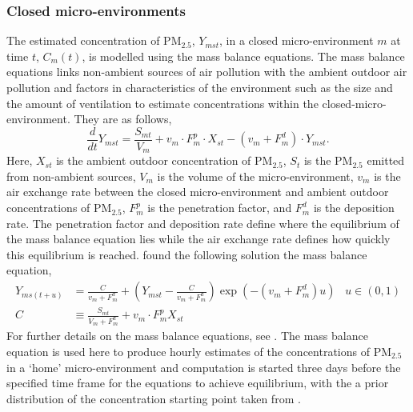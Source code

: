 \documentclass{article}
\begin{document}
\clearpage
\subsubsection{Closed micro-environments}\label{sec::micro}


The estimated concentration of PM$_{2.5}$, $Y_{mst}$, in a closed micro-environment $m$ at time $t$, $C_m(t)$, is modelled using the mass balance equations. The mass balance equations links non-ambient sources of air pollution with the ambient outdoor air pollution and factors in characteristics of the environment such as the size and the amount of ventilation to estimate concentrations within the closed-micro-environment. They are as follows, 
\begin{equation*}
	\frac{d}{dt}Y_{mst} = \frac{S_{mt}}{V_m} + v_m\cdot F^p_m \cdot X_{st} - (v_m + F^d_m)\cdot Y_{mst}. 
\end{equation*}
Here, $X_{st}$ is the ambient outdoor concentration of PM$_{2.5}$, $S_t$ is the PM$_{2.5}$ emitted from non-ambient sources, $V_m$ is the volume of the micro-environment, $v_m$ is the air exchange rate between the closed micro-environment and ambient outdoor concentrations of PM$_{2.5}$, $F^p_m$ is the penetration factor, and $F^d_m$ is the deposition rate. The penetration factor and deposition rate define where the equilibrium of the mass balance equation lies while the air exchange rate defines how quickly this equilibrium is reached. \citet{zidek2007framework} found the following solution the mass balance equation, 
\begin{equation*}
	\begin{split}
		Y_{ms(t+u)} &= \frac{C}{v_m + F^d_m} + \left(Y_{mst} - \frac{C}{v_m + F^d_m}\right)\exp\left(-(v_m + F^d_m)u\right) \;\;\; u \in (0,1)\\
		C &\equiv \frac{S_{mt}}{V_m + F^d_m} + v_m\cdot F^p_m X_{st} 
	\end{split}
\end{equation*}
For further details on the mass balance equations, see \citet{zidek2003computational, zidek2007framework}. The mass balance equation is used here to produce hourly estimates of the concentrations of PM$_{2.5}$ in a `home' micro-environment and computation is started three days before the specified time frame for the equations to achieve equilibrium, with the a prior distribution of the concentration starting point taken from  \citet{wallace1993indoor}. \\
\end{document}
